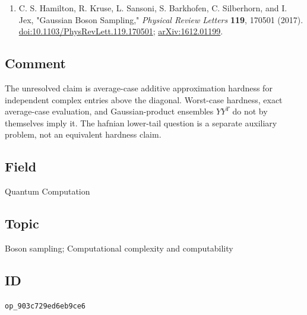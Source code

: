 \begin{enumerate}[label={},leftmargin=4.8em,labelsep=0.5em]
  \footnotesize
  \item[\textup{[HKS+17]}]\label{ref:ghe-hamilton}
  C. S. Hamilton, R. Kruse, L. Sansoni, S. Barkhofen, C. Silberhorn, and I. Jex, "Gaussian Boson Sampling," \emph{Physical Review Letters} \textbf{119}, 170501 (2017). \href{https://doi.org/10.1103/PhysRevLett.119.170501}{doi:10.1103/PhysRevLett.119.170501}; \href{https://arxiv.org/abs/1612.01199}{arXiv:1612.01199}.
\end{enumerate}

\subsection*{Comment}

The unresolved claim is average-case additive approximation hardness for independent complex entries above the diagonal.
Worst-case hardness, exact average-case evaluation, and Gaussian-product ensembles $YY^T$ do not by themselves imply it.
The hafnian lower-tail question is a separate auxiliary problem, not an equivalent hardness claim.

\subsection*{Field}

Quantum Computation

\subsection*{Topic}

Boson sampling; Computational complexity and computability

\subsection*{ID}

\texttt{op\_903c729ed6eb9ce6}
